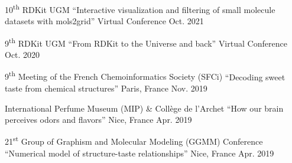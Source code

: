 
\begin{cvhonors}

    \cvhonor
    {10\textsuperscript{th} RDKit UGM}
    {``Interactive visualization and filtering of small molecule datasets with mols2grid''}
    {Virtual Conference}
    {Oct. 2021}

    \cvhonor
    {9\textsuperscript{th} RDKit UGM}
    {``From RDKit to the Universe and back''}
    {Virtual Conference}
    {Oct. 2020}

    \cvhonor
    {9\textsuperscript{th} Meeting of the French Chemoinformatics Society (SFCi)}
    {``Decoding sweet taste from chemical structures''}
    {Paris, France}
    {Nov. 2019}
  
    \cvhonor
    {International Perfume Museum (MIP) \& Collège de l'Archet}
    {``How our brain perceives odors and flavors''}
    {Nice, France}
    {Apr. 2019}

    \cvhonor
    {21\textsuperscript{st} Group of Graphism and Molecular Modeling (GGMM) Conference}
    {``Numerical model of structure-taste relationships''}
    {Nice, France}
    {Apr. 2019}

\end{cvhonors}
